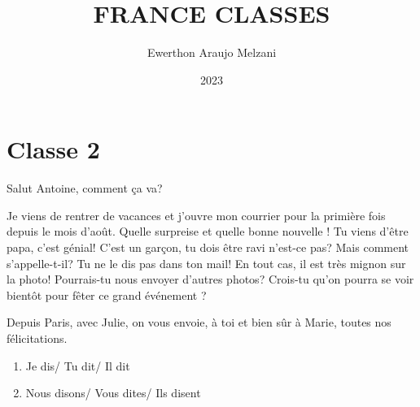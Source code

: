 \documentclass{article}
\title{FRANCE CLASSES}
\author{Ewerthon Araujo Melzani}
\date{2023}
\begin{document}
\maketitle

\section*{Classe 2}

\vspace*{1.5 cm}


Salut Antoine, comment ça va?

Je viens de rentrer de vacances et j'ouvre mon courrier pour la primière fois depuis le mois d'août. Quelle surpreise et quelle
bonne nouvelle ! Tu viens d'être papa, c'est génial! C'est un garçon, tu dois être ravi n'est-ce pas? Mais comment s'appelle-t-il? 
Tu ne le dis pas dans ton mail! En tout cas, il est très mignon sur la photo! Pourrais-tu nous envoyer d'autres photos? Crois-tu qu'on
pourra se voir bientôt pour fêter ce grand événement ?

Depuis Paris, avec Julie, on vous envoie, à toi et bien sûr à Marie, toutes nos félicitations.


\vspace*{1.5 cm}

\begin{enumerate}
    \item Je dis/ Tu dit/ Il dit
    \item Nous disons/ Vous dites/ Ils disent
\end{enumerate}

\vspace*{1.5 cm}
\end{document}
